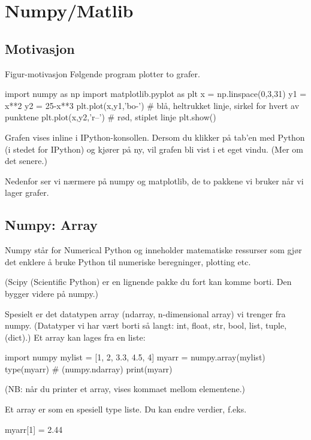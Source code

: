 \chapter{Numpy/Matlib}

\section{Motivasjon}

Figur-motivasjon
Følgende program plotter to grafer. 

\begin{usncodebox}
import numpy as np
import matplotlib.pyplot as plt   
x = np.linspace(0,3,31)
y1 = x**2
y2 = 25-x**3
plt.plot(x,y1,'bo-')   # blå, heltrukket linje, sirkel for hvert av punktene  
plt.plot(x,y2,'r--')   # rød, stiplet linje
plt.show()
\end{usncodebox}

Grafen vises inline i IPython-konsollen. Dersom du klikker på tab'en med Python (i stedet for IPython) og kjører på ny, vil grafen bli vist i et eget vindu. (Mer om det senere.) 

Nedenfor ser vi nærmere på numpy og matplotlib, de to pakkene vi bruker når vi lager grafer. 

\section{Numpy: Array}

Numpy står for Numerical Python og inneholder matematiske ressurser som gjør det enklere å bruke Python til numeriske beregninger, plotting etc. 

(Scipy (Scientific Python) er en lignende pakke du fort kan komme borti. Den bygger videre på numpy.)

Spesielt er det datatypen array (ndarray, n-dimensional array) vi trenger fra numpy. (Datatyper vi har vært borti så langt: int, float, str, bool, list, tuple, (dict).) Et array kan lages fra en liste:

\begin{usncodebox}
import numpy
mylist = [1, 2, 3.3, 4.5, 4] 
myarr = numpy.array(mylist) 
type(myarr)    # (numpy.ndarray)
print(myarr)
\end{usncodebox}

(NB: når du printer et array, vises kommaet mellom elementene.)  

Et array er som en spesiell type liste. Du kan endre verdier, f.eks.
\begin{usncodebox}
myarr[1] = 2.44
\end{usncodebox}

